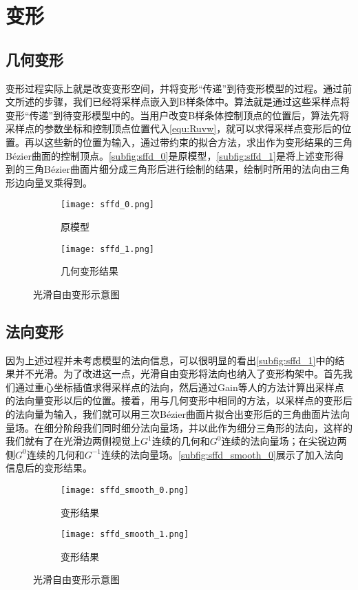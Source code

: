 \section{变形}
\subsection{几何变形}
变形过程实际上就是改变变形空间，并将变形“传递”到待变形模型的过程。通过前文所述的步骤，我们已经将采样点嵌入到B样条体中。算法就是通过这些采样点将变形“传递”到待变形模型中的。当用户改变B样条体控制顶点的位置后，算法先将采样点的参数坐标和控制顶点位置代入\autoref{equ:Ruvw}，就可以求得采样点变形后的位置。再以这些新的位置为输入，通过带约束的拟合方法，求出作为变形结果的三角Bézier曲面的控制顶点。\autoref{subfig:sffd_0}是原模型，\autoref{subfig:sffd_1}是将上述变形得到的三角Bézier曲面片细分成三角形后进行绘制的结果，绘制时所用的法向由三角形边向量叉乘得到。

\begin{figure}[htbp]
	\centering
	\begin{subfigure}[b]{.4\textwidth}
		\centering
		\texttt{[image: sffd\_0.png]}
		\caption{原模型}\label{subfig:sffd_0}
	\end{subfigure}
	\quad
	\begin{subfigure}[b]{.4\textwidth}
		\centering
		\texttt{[image: sffd\_1.png]}
		\caption{几何变形结果}\label{subfig:sffd_1}
	\end{subfigure}
    \caption{光滑自由变形示意图}\label{fig:sffd}
\end{figure}

\subsection{法向变形}
因为上述过程并未考虑模型的法向信息，可以很明显的看出\autoref{subfig:sffd_1}中的结果并不光滑。为了改进这一点，光滑自由变形将法向也纳入了变形构架中。首先我们通过重心坐标插值求得采样点的法向，然后通过Gain等人\cite{gain1999}的方法计算出采样点的法向量变形以后的位置。接着，用与几何变形中相同的方法，以采样点的变形后的法向量为输入，我们就可以用三次Bézier曲面片拟合出变形后的三角曲面片法向量场。在细分阶段我们同时细分法向量场，并以此作为细分三角形的法向，这样的我们就有了在光滑边两侧视觉上$G^1$连续的几何和$G^0$连续的法向量场；在尖锐边两侧$G^0$连续的几何和$G^{-1}$连续的法向量场。\autoref{subfig:sffd_smooth_0}展示了加入法向信息后的变形结果。

\begin{figure}[htbp]
	\centering
	\begin{subfigure}[b]{.4\textwidth}
		\centering
		\texttt{[image: sffd\_smooth\_0.png]}
		\caption{变形结果}\label{subfig:sffd_smooth_0}
	\end{subfigure}
	\quad
	\begin{subfigure}[b]{.4\textwidth}
		\centering
		\texttt{[image: sffd\_smooth\_1.png]}
		\caption{变形结果}\label{subfig:sffd_smooth_1}
	\end{subfigure}
    \caption{光滑自由变形示意图}\label{fig:sffd}
\end{figure}

